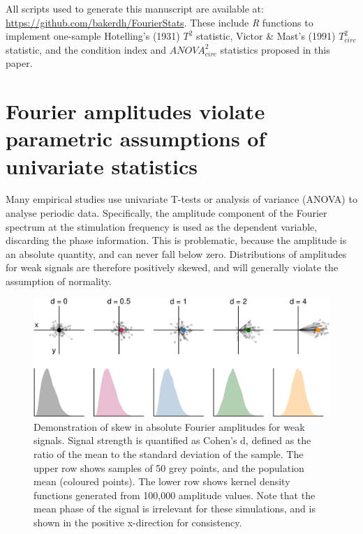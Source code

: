 \documentclass[]{article}
\begin{document}
All scripts used to generate this manuscript are available at: \url{https://github.com/bakerdh/FourierStats}. These include \emph{R} functions to implement one-sample Hotelling's (1931) \(T^2\) statistic, Victor \& Mast's (1991) \(T^2_{circ}\) statistic, and the condition index and \(ANOVA^2_{circ}\) statistics proposed in this paper.

\hypertarget{fourier-amplitudes-violate-parametric-assumptions-of-univariate-statistics}{%
\section{Fourier amplitudes violate parametric assumptions of univariate statistics}\label{fourier-amplitudes-violate-parametric-assumptions-of-univariate-statistics}}

Many empirical studies use univariate T-tests or analysis of variance (ANOVA) to analyse periodic data. Specifically, the amplitude component of the Fourier spectrum at the stimulation frequency is used as the dependent variable, discarding the phase information. This is problematic, because the amplitude is an absolute quantity, and can never fall below zero. Distributions of amplitudes for weak signals are therefore positively skewed, and will generally violate the assumption of normality.

\begin{figure}

{\centering \includegraphics{manuscript_files/figure-latex/amphists-1} 

}

\caption{Demonstration of skew in absolute Fourier amplitudes for weak signals. Signal strength is quantified as Cohen's d, defined as the ratio of the mean to the standard deviation of the sample. The upper row shows samples of 50 grey points, and the population mean (coloured points). The lower row shows kernel density functions generated from 100,000 amplitude values. Note that the mean phase of the signal is irrelevant for these simulations, and is shown in the positive x-direction for consistency.}\label{fig:amphists}
\end{figure}
\end{document}
